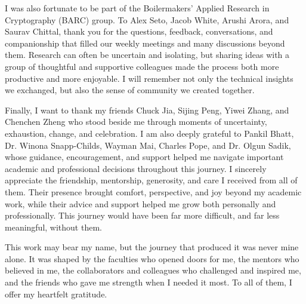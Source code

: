 \begin{acknowledgments}
I was also fortunate to be part of the Boilermakers' Applied Research in Cryptography (BARC) group. To Alex Seto, Jacob White, Arushi Arora, and Saurav Chittal, thank you for the questions, feedback, conversations, and companionship that filled our weekly meetings and many discussions beyond them. Research can often be uncertain and isolating, but sharing ideas with a group of thoughtful and supportive colleagues made the process both more productive and more enjoyable. I will remember not only the technical insights we exchanged, but also the sense of community we created together.

Finally, I want to thank my friends Chuck Jia, Sijing Peng, Yiwei Zhang, and Chenchen Zheng who stood beside me through moments of uncertainty, exhaustion, change, and celebration. I am also deeply grateful to Pankil Bhatt, Dr. Winona Snapp-Childs, Wayman Mai, Charles Pope, and Dr. Olgun Sadik, whose guidance, encouragement, and support helped me navigate important academic and professional decisions throughout this journey. I sincerely appreciate the friendship, mentorship, generosity, and care I received from all of them. Their presence brought comfort, perspective, and joy beyond my academic work, while their advice and support helped me grow both personally and professionally. This journey would have been far more difficult, and far less meaningful, without them.

This work may bear my name, but the journey that produced it was never mine alone. It was shaped by the faculties who opened doors for me, the mentors who believed in me, the collaborators and colleagues who challenged and inspired me, and the friends who gave me strength when I needed it most. To all of them, I offer my heartfelt gratitude.
\end{acknowledgments}


\tableofcontents

